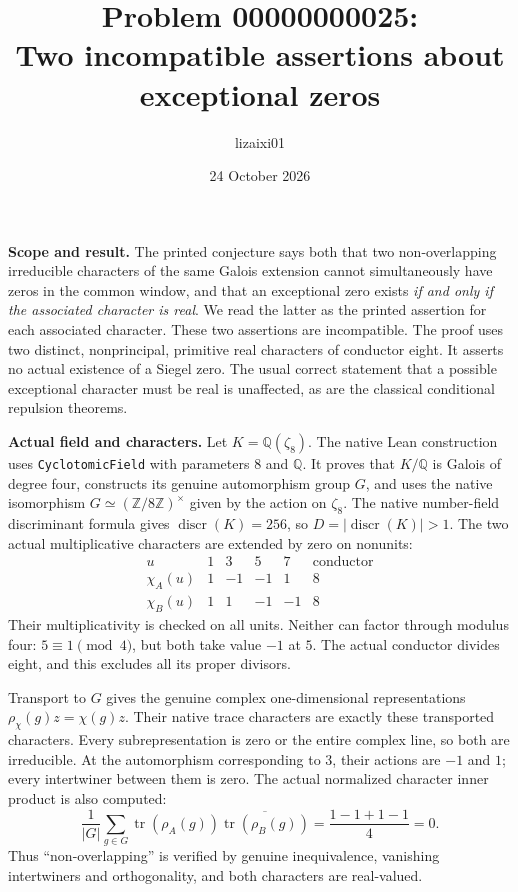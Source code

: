 \documentclass[10pt,a4paper]{article}
\title{Problem 00000000025:\\Two incompatible assertions about exceptional zeros}
\author{lizaixi01}
\date{24 October 2026}
\begin{document}
\maketitle
\vspace{-15pt}

\textbf{Scope and result.}
The printed conjecture says both that two non-overlapping irreducible characters
of the same Galois extension cannot simultaneously have zeros in the common
window, and that an exceptional zero exists \emph{if and only if the associated
character is real}. We read the latter as the printed assertion for each
associated character. These two assertions are incompatible. The proof uses
two distinct, nonprincipal, primitive real characters of conductor eight.
It asserts no actual existence of a Siegel zero. The usual correct statement
that a possible exceptional character must be real is unaffected, as are the
classical conditional repulsion theorems.

\textbf{Actual field and characters.}
Let $K=\mathbb Q(\zeta_8)$. The native Lean construction uses
\texttt{CyclotomicField} with parameters $8$ and $\mathbb Q$.
It proves that $K/\mathbb Q$ is Galois of degree four, constructs its genuine
automorphism group $G$, and uses the native isomorphism
$G\simeq(\mathbb Z/8\mathbb Z)^\times$ given by the action on $\zeta_8$.
The native number-field discriminant formula gives
$\operatorname{discr}(K)=256$, so $D=|\operatorname{discr}(K)|>1$.
The two actual multiplicative characters are extended by zero on nonunits:
\[
\begin{array}{c|rrrr|c}
u&1&3&5&7&\text{conductor}\\\hline
\chi_A(u)&1&-1&-1&1&8\\
\chi_B(u)&1&1&-1&-1&8
\end{array}
\]
Their multiplicativity is checked on all units. Neither can factor through
modulus four: $5\equiv1\pmod4$, but both take value $-1$ at $5$.
The actual conductor divides eight, and this excludes all its proper divisors.

Transport to $G$ gives the genuine complex one-dimensional representations
$\rho_\chi(g)z=\chi(g)z$. Their native trace characters are exactly these
transported characters. Every subrepresentation is zero or the entire complex
line, so both are irreducible. At the automorphism corresponding to $3$, their
actions are $-1$ and $1$; every intertwiner between them is zero.
The actual normalized character inner product is also computed:
\[
 \frac1{|G|}\sum_{g\in G}\operatorname{tr}(\rho_A(g))
       \overline{\operatorname{tr}(\rho_B(g))}
 =\frac{1-1+1-1}{4}=0.
\]
Thus ``non-overlapping'' is verified by genuine inequivalence, vanishing
intertwiners and orthogonality, and both characters are real-valued.
\end{document}

